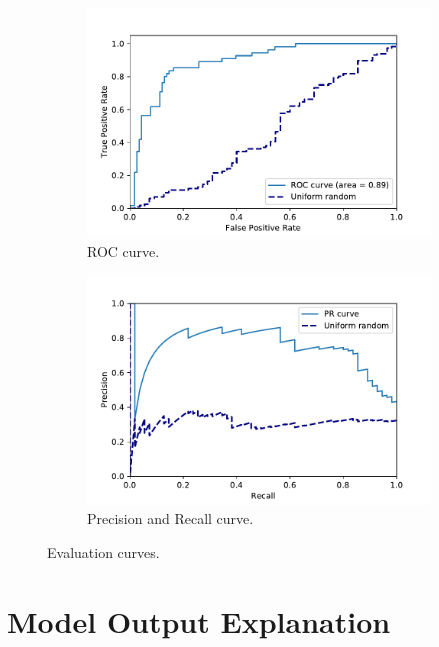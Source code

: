 \begin{figure}
\centering
\begin{subfigure}{.5\textwidth}
  \centering
  \includegraphics[width=1\linewidth]{figures/Experiements/Eval/ROC_curve.pdf}
  \caption{ROC curve.}
  \label{fig:roc_curve}
\end{subfigure}%
\begin{subfigure}{.5\textwidth}
  \centering
  \includegraphics[width=1\linewidth]{figures/Experiements/Eval/pr_curve_curve.pdf}
  \caption{Precision and Recall curve.}
  \label{fig:pr_curve}
\end{subfigure}
\caption[Curve]{Evaluation curves.}
\label{fig:roc_and_pr_curve}
\end{figure}

\newpage
\section{Model Output Explanation}
\label{sec:model_out_exp}

